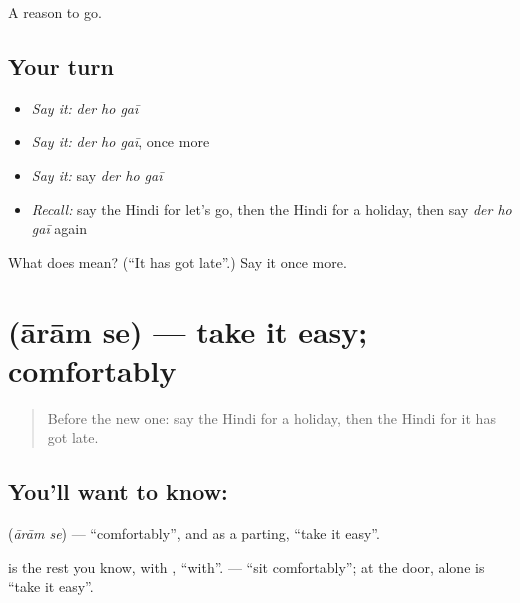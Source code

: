 \begin{grammarlens}[title={What you've built}]
A reason to go.
\end{grammarlens}

\subsection*{Your turn}
\begin{itemize}
\raggedright
  \item \emph{Say it:} \emph{der ho gaī}
  \item \emph{Say it:} \emph{der ho gaī}, once more
  \item \emph{Say it:} say \emph{der ho gaī}
  \item \emph{Recall:} say the Hindi for let's go, then the Hindi for a holiday, then say \emph{der ho gaī} again
\end{itemize}

\begin{tcolorbox}[breakable,colback=teal!4,colframe=teal!35!black,title={Before you move on}]
What does    mean? (\textquotedblleft{}It has got late\textquotedblright{}.) Say it once more.
\end{tcolorbox}
\section[\texorpdfstring{\hi{आराम} \hi{से} (ārām se)}{आराम से (ārām se)}]{  (ārām se) — take it easy; comfortably}

\label{lesson:HI-C122-aramse}



\begin{quote}
Before the new one: say the Hindi for a holiday, then the Hindi for it has got late.
\end{quote}

\subsection*{You'll want to know:  }
\textbf{ } (\emph{ārām se}) — \textquotedblleft{}comfortably\textquotedblright{}, and as a parting, \textquotedblleft{}take it easy\textquotedblright{}.

\textbf{} is the rest you know, with \textbf{}, \textquotedblleft{}with\textquotedblright{}. \textbf{  } — \textquotedblleft{}sit comfortably\textquotedblright{}; at the door, \textbf{ } alone is \textquotedblleft{}take it easy\textquotedblright{}.


